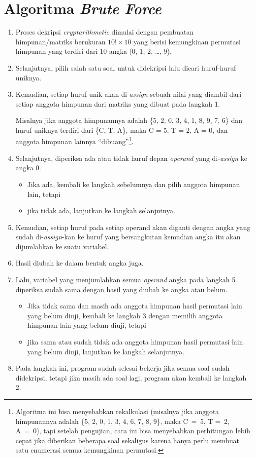 \documentclass{article}
\begin{document}
\section{Algoritma \textit{Brute Force}}
\begin{enumerate}
  \item Proses dekripsi \textit{cryptarithmetic} dimulai dengan pembuatan
    himpunan/matriks berukuran $10! \times 10$ yang berisi kemungkinan
    permutasi himpunan yang terdiri dari 10 angka (0, 1, 2, \ldots, 9).
  \item Selanjutnya, pilih salah satu soal untuk didekripsi lalu dicari
    huruf-huruf uniknya.
  \item Kemudian, setiap huruf unik akan di-\textit{assign} sebuah nilai yang
    diambil dari setiap anggota himpunan dari matriks yang dibuat pada langkah
    1.

    Misalnya jika anggota himpunannya adalah \{5, 2, 0, 3, 4, 1, 8, 9,
    7, 6\} dan huruf uniknya terdiri dari \{C, T, A\}, maka C = 5, T = 2, A =
    0, dan anggota himpunan lainnya ``dibuang''\footnote{Algoritma ini bisa
    menyebabkan rekalkulasi (misalnya jika anggota himpunannya adalah \{5, 2, 0,
    1, 3, 4, 6, 7, 8, 9\}, maka C~=~5, T =~2, A~=~0), tapi setelah pengujian,
    cara ini bisa menyebabkan perhitungan lebih cepat jika diberikan beberapa
    soal sekaligus karena hanya perlu membuat satu enumerasi semua kemungkinan
    permutasi.}.
  \item Selanjutnya, diperiksa ada atau tidak huruf depan \textit{operand} yang
    di-\textit{assign} ke angka 0.
    \begin{itemize}
      \item Jika ada, kembali ke langkah sebelumnya dan pilih anggota himpunan
        lain, tetapi
      \item jika tidak ada, lanjutkan ke langkah selanjutnya.
    \end{itemize}
  \item Kemudian, setiap huruf pada setiap operand akan diganti dengan angka
    yang sudah di-\textit{assign}-kan ke huruf yang bersangkutan kemudian angka
    itu akan dijumlahkan ke suatu variabel.
  \item Hasil diubah ke dalam bentuk angka juga.
  \item Lalu, variabel yang menjumlahkan semua \textit{operand} angka
    pada langkah 5 diperiksa sudah sama dengan hasil yang diubah ke angka atau
    belum.
    \begin{itemize}
      \item Jika tidak sama dan masih ada anggota himpunan hasil permutasi lain
        yang belum diuji, kembali ke langkah 3 dengan memilih anggota himpunan
        lain yang belum diuji, tetapi
      \item jika sama atau sudah tidak ada anggota himpunan hasil permutasi
        lain yang belum diuji, lanjutkan ke langkah selanjutnya.
    \end{itemize}
  \item Pada langkah ini, program sudah selesai bekerja jika semua soal sudah
    didekripsi, tetapi jika masih ada soal lagi, program akan kembali ke
    langkah 2.
\end{enumerate}
\end{document}
